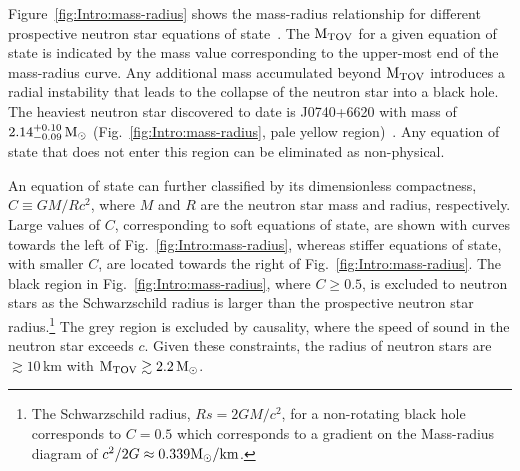 \documentclass[../Thesis.tex]{subfiles}
\begin{document}
    Figure~\ref{fig:Intro:mass-radius} shows the mass-radius relationship for different prospective neutron star equations of state~\cite{Hu2020}. 
    The $\mathrm{M_{TOV}}$ for a given equation of state is indicated by the mass value corresponding to the upper-most end of the mass-radius curve.
    Any additional mass accumulated beyond $\mathrm{M_{TOV}}$ introduces a radial instability that leads to the collapse of the neutron star into a black hole.
    The heaviest neutron star  discovered to date is J0740+6620 with mass of $2.14^{+0.10}_{-0.09}\,\mathrm{M}_{\odot}$ (Fig.~\ref{fig:Intro:mass-radius}, pale yellow region)~\cite{Cromartie2020}.
    Any equation of state that does not enter this region can be eliminated as non-physical. \par
    
    An equation of state can further classified by its dimensionless compactness, $C\equiv GM/Rc^2$, where $M$ and $R$ are the neutron star mass and radius, respectively.
    Large values of $C$, corresponding to soft equations of state, are shown with curves towards the left of Fig.~\ref{fig:Intro:mass-radius}, whereas stiffer equations of state, with smaller $C$, are located towards the right of Fig.~\ref{fig:Intro:mass-radius}.
    The black region in Fig.~\ref{fig:Intro:mass-radius}, where $C\geqslant 0.5$, is excluded to neutron stars as the Schwarzschild radius is larger than the prospective neutron star radius.\footnote{The Schwarzschild radius, $Rs = 2GM/c^2$, for a non-rotating black hole corresponds to $C=0.5$ which corresponds to a gradient on the Mass-radius diagram of $c^2/2G \approx 0.339 \mathrm{M}_{\odot}/\mathrm{km}$.}
    The grey region is excluded by causality, where the speed of sound in the neutron star exceeds $c$.
    Given these constraints, the radius of neutron stars are $\gtrsim 10\,$km with $\mathrm{M_{TOV}} \gtrsim 2.2\, \mathrm{M}_{\odot}$. 
    
    







\end{document}
